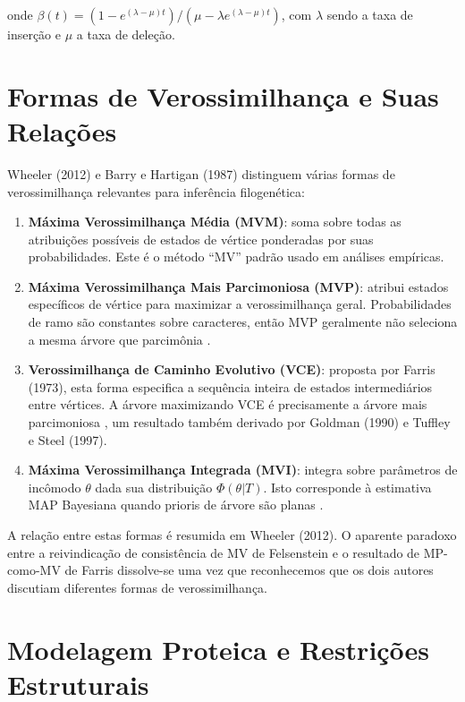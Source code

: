 onde $\beta(t) = (1 - e^{(\lambda-\mu)t})/(\mu - \lambda e^{(\lambda-\mu)t})$, com $\lambda$ sendo a taxa de inserção e $\mu$ a taxa de deleção.

\section{Formas de Verossimilhança e Suas Relações}

Wheeler (2012) e Barry e Hartigan (1987) distinguem várias formas de verossimilhança relevantes para inferência filogenética:

\begin{enumerate}
    \item \textbf{Máxima Verossimilhança Média (MVM)}: soma sobre todas as atribuições possíveis de estados de vértice ponderadas por suas probabilidades. Este é o método ``MV'' padrão usado em análises empíricas.

    \item \textbf{Máxima Verossimilhança Mais Parcimoniosa (MVP)}: atribui estados específicos de vértice para maximizar a verossimilhança geral. Probabilidades de ramo são constantes sobre caracteres, então MVP geralmente não seleciona a mesma árvore que parcimônia \parencite{wheeler2012}.

    \item \textbf{Verossimilhança de Caminho Evolutivo (VCE)}: proposta por Farris (1973), esta forma especifica a sequência inteira de estados intermediários entre vértices. A árvore maximizando VCE é precisamente a árvore mais parcimoniosa \parencite{wheeler2012}, um resultado também derivado por Goldman (1990) e Tuffley e Steel (1997).

    \item \textbf{Máxima Verossimilhança Integrada (MVI)}: integra sobre parâmetros de incômodo $\theta$ dada sua distribuição $\Phi(\theta|T)$. Isto corresponde à estimativa MAP Bayesiana quando prioris de árvore são planas \parencite{wheeler2012,steel2000}.
\end{enumerate}

A relação entre estas formas é resumida em Wheeler (2012). O aparente paradoxo entre a reivindicação de consistência de MV de Felsenstein e o resultado de MP-como-MV de Farris dissolve-se uma vez que reconhecemos que os dois autores discutiam diferentes formas de verossimilhança.

\section{Modelagem Proteica e Restrições Estruturais}

